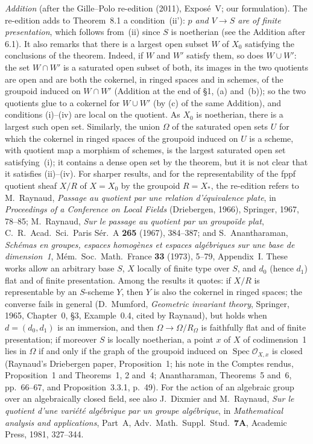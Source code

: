 \par\medskip\noindent
\emph{Addition} (after the Gille--Polo re-edition (2011), Exposé~V; our
formulation). The re-edition adds to Theorem~8.1 a condition~(ii'):
\emph{\(p\) and \(V\to S\) are of finite presentation}, which follows from~(ii)
since \(S\) is noetherian (see the Addition after 6.1). It also remarks that
there is a largest open subset \(W\) of \(X_0\) satisfying the conclusions of
the theorem. Indeed, if \(W\) and \(W'\) satisfy them, so does \(W\cup W'\): the
set \(W\cap W'\) is a saturated open subset of both, its images in the two
quotients are open and are both the cokernel, in ringed spaces and in
schemes, of the groupoid induced on \(W\cap W'\) (Addition at the end of
\S1, (a) and~(b)); so the two quotients glue to a cokernel for \(W\cup W'\)
(by (c) of the same Addition), and conditions (i)--(iv) are local on the
quotient. As \(X_0\) is noetherian, there is a largest such open set.
Similarly, the union \(\Omega\) of the saturated open sets \(U\) for which the
cokernel in ringed spaces of the groupoid induced on \(U\) is a scheme, with
quotient map a morphism of schemes, is the largest saturated open set
satisfying~(i); it contains a dense open set by the theorem, but it is not
clear that it satisfies (ii)--(iv). For sharper results, and for the
representability of the fppf quotient sheaf \(X/R\) of \(X=X_0\) by the
groupoid \(R=X_\ast\), the re-edition refers to M.~Raynaud, \emph{Passage au
quotient par une relation d'équivalence plate}, in \emph{Proceedings of a
Conference on Local Fields} (Driebergen, 1966), Springer, 1967, 78--85;
M.~Raynaud, \emph{Sur le passage au quotient par un groupoïde plat}, C.~R.\
Acad.\ Sci.\ Paris Sér.~A \textbf{265} (1967), 384--387; and S.~Anantharaman,
\emph{Schémas en groupes, espaces homogènes et espaces algébriques sur une
base de dimension~1}, Mém.\ Soc.\ Math.\ France \textbf{33} (1973), 5--79,
Appendix~I. These works allow an arbitrary base \(S\), \(X\) locally of finite
type over \(S\), and \(d_0\) (hence \(d_1\)) flat and of finite presentation.
Among the results it quotes: if \(X/R\) is representable by an \(S\)-scheme
\(Y\), then \(Y\) is also the cokernel in ringed spaces; the converse fails in
general (D.~Mumford, \emph{Geometric invariant theory}, Springer, 1965,
Chapter~0, \S3, Example~0.4, cited by Raynaud), but holds when
\(d=(d_0,d_1)\) is an immersion, and then \(\Omega\to\Omega/R_\Omega\) is
faithfully flat and of finite presentation; if moreover \(S\) is locally
noetherian, a point \(x\) of \(X\) of codimension~1 lies in \(\Omega\) if and only
if the graph of the groupoid induced on \(\operatorname{Spec}\mathcal O_{X,x}\) is
closed (Raynaud's Driebergen paper, Proposition~1; his note in the Comptes
rendus, Proposition~1 and Theorems~1, 2 and~4; Anantharaman, Theorems~5
and~6, pp.~66--67, and
Proposition~3.3.1, p.~49). For the action of an algebraic group over an
algebraically closed field, see also J.~Dixmier and M.~Raynaud, \emph{Sur
le quotient d'une variété algébrique par un groupe algébrique}, in
\emph{Mathematical analysis and applications}, Part~A, Adv.\ Math.\ Suppl.\
Stud.\ \textbf{7A}, Academic Press, 1981, 327--344.
\par\medskip

